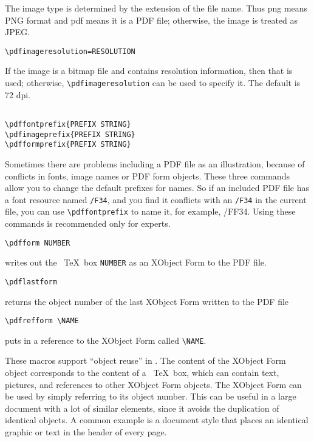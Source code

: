 The image type is determined by the extension of the file name. Thus png 
means PNG format and pdf means it is a PDF file; otherwise, the image is treated 
as JPEG. 

\begin{verbatim}
\pdfimageresolution=RESOLUTION 
\end{verbatim}

If the image is a bitmap file and contains resolution information, then that is used; 
otherwise, \verb|\pdfimageresolution| can be used to specify it. The default is 72 dpi. 

\begin{verbatim}

\pdffontprefix{PREFIX STRING} 
\pdfimageprefix{PREFIX STRING} 
\pdfformprefix{PREFIX STRING} 

\end{verbatim}

Sometimes there are problems including a PDF file as an illustration, because of 
conflicts in fonts, image names or PDF form objects. These three commands allow 
you to change the default prefixes for names. So if an included PDF file has a font 
resource named \verb|/F34|, and you find it conflicts with an \verb|/F34| in the current file, you 
can use \verb|\pdffontprefix| to name it, for example, /FF34. Using these commands 
is recommended only for experts. 


\begin{verbatim}
\pdfform NUMBER 
\end{verbatim}

writes out the \ \TeX\  box \verb|NUMBER| as an XObject Form to the PDF file. 

\begin{verbatim}
\pdflastform 
\end{verbatim}

returns the object number of the last XObject Form written to the PDF file 

\begin{verbatim}
\pdfrefform \NAME 
\end{verbatim}

puts in a reference to the XObject Form called \verb|\NAME|. 

These macros support ``object reuse'' in \pdfTEX. The content of the XObject 
Form object corresponds to the content of a \ \TeX\  box, which can contain text, 
pictures, and references to other XObject Form objects. The XObject Form can 
be used by simply referring to its object number. This can be useful in a large 
document with a lot of similar elements, since it avoids the duplication of identical 
objects. A common example is a document style that places an identical graphic or 
text in the header of every page. 

